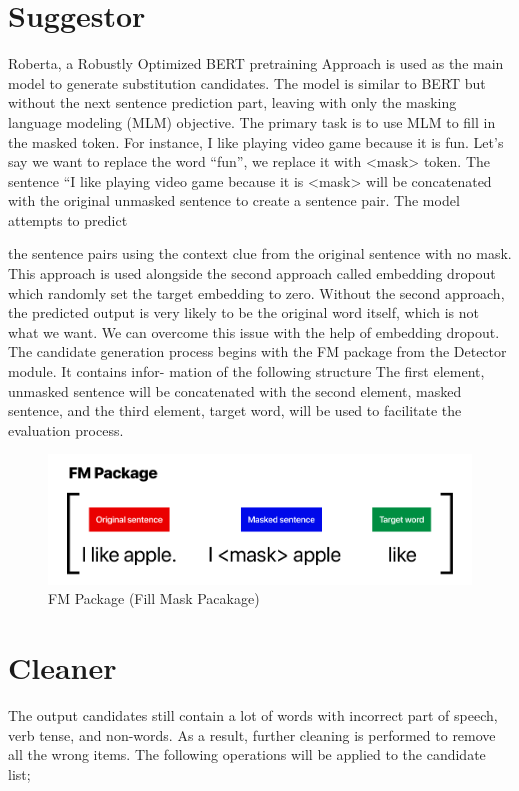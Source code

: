 \documentclass[12pt,oneside,openright,a4paper]{cpe-english-project}
\begin{document}
\section{Suggestor}
Roberta, a Robustly Optimized BERT pretraining Approach is used as the main model to generate substitution candidates. The model is similar to BERT but without the next sentence prediction part, leaving with only the masking language modeling (MLM) objective. The primary task is to use MLM to fill in the masked token. For instance, I like playing video game because it is fun. Let’s say we want to replace the word “fun”, we replace it with <mask> token. The sentence “I like playing video game because it is <mask> will be concatenated with the original unmasked sentence to create a sentence pair. The model attempts to predict

the sentence pairs using the context clue from the original sentence with no mask. This approach is used alongside the second approach called embedding dropout which randomly set the target embedding to zero. Without the second approach, the predicted output is very likely to be the original word itself, which is not what we want. We can overcome this issue with the help of embedding dropout.
The candidate generation process begins with the FM package from the Detector module. It contains infor- mation of the following structure The first element, unmasked sentence will be concatenated with the second element, masked sentence, and the third element, target word, will be used to facilitate the evaluation process. 

\begin{figure}[!h]\centering
\includegraphics[width=15cm]{./img/chp3/Package.png}
\caption{FM Package (Fill Mask Pacakage)}\label{fig:FMPX}
\end{figure}


\section{Cleaner}
The output candidates still contain a lot of words with incorrect part of speech, verb tense, and non-words. As a result, further cleaning is performed to remove all the wrong items. The following operations will be applied to the candidate list;
\end{document}
